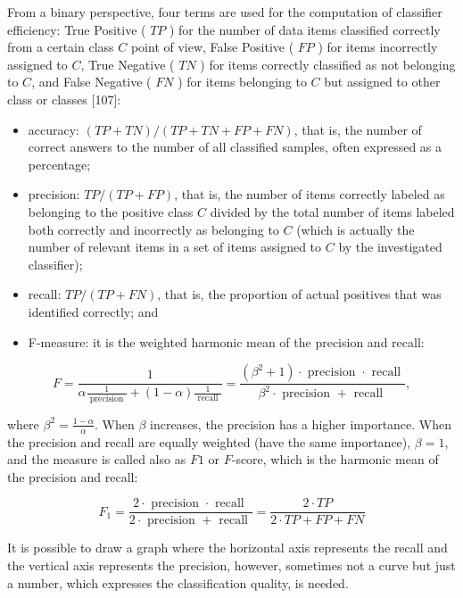 \documentclass[11pt,openany,executivepaper]{book}
\begin{document}
From a binary perspective, four terms are used for the computation of classifier efficiency: True Positive ( $T P$ ) for the number of data items classified correctly from a certain class $C$ point of view, False Positive ( $F P$ ) for items incorrectly assigned to $C$, True Negative ( $T N$ ) for items correctly classified as not belonging to $C$, and False Negative ( $F N$ ) for items belonging to $C$ but assigned to other class or classes [107]:

\begin{itemize}
  \item accuracy: $(T P+T N) /(T P+T N+F P+F N)$, that is, the number of correct answers to the number of all classified samples, often expressed as a percentage;
  \item precision: $T P /(T P+F P)$, that is, the number of items correctly labeled as belonging to the positive class $C$ divided by the total number of items labeled both correctly and incorrectly as belonging to $C$ (which is actually the number of relevant items in a set of items assigned to $C$ by the investigated classifier);
  \item recall: $T P /(T P+F N)$, that is, the proportion of actual positives that was identified correctly; and
  \item F-measure: it is the weighted harmonic mean of the precision and recall:
\end{itemize}

$$
F=\frac{1}{\alpha \frac{1}{\text { precision }}+(1-\alpha) \frac{1}{\text { recall }}}=\frac{\left(\beta^{2}+1\right) \cdot \text { precision } \cdot \text { recall }}{\beta^{2} \cdot \text { precision }+ \text { recall }},
$$

where $\beta^{2}=\frac{1-\alpha}{\alpha}$. When $\beta$ increases, the precision has a higher importance. When the precision and recall are equally weighted (have the same importance), $\beta=1$, and the measure is called also as $F 1$ or $F$-score, which is the harmonic mean of the precision and recall:

$$
F_{1}=\frac{2 \cdot \text { precision } \cdot \text { recall }}{2 \cdot \text { precision }+ \text { recall }}=\frac{2 \cdot T P}{2 \cdot T P+F P+F N}
$$

It is possible to draw a graph where the horizontal axis represents the recall and the vertical axis represents the precision, however, sometimes not a curve but just a number, which expresses the classification quality, is needed.
\end{document}
